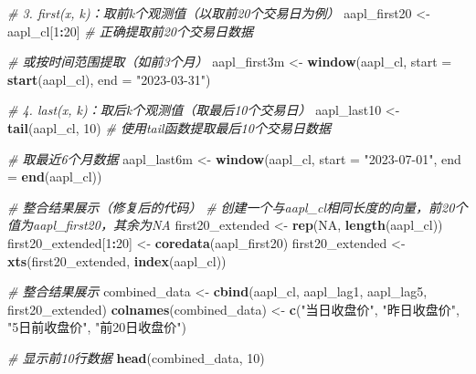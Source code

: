 \documentclass[]{ctexbook}
\newenvironment{Shaded}{\begin{snugshade}}{\end{snugshade}}
\newcommand{\AttributeTok}[1]{\textcolor[rgb]{0.13,0.29,0.53}{#1}}
\newcommand{\CommentTok}[1]{\textcolor[rgb]{0.56,0.35,0.01}{\textit{#1}}}
\newcommand{\ConstantTok}[1]{\textcolor[rgb]{0.56,0.35,0.01}{#1}}
\newcommand{\DecValTok}[1]{\textcolor[rgb]{0.00,0.00,0.81}{#1}}
\newcommand{\FunctionTok}[1]{\textcolor[rgb]{0.13,0.29,0.53}{\textbf{#1}}}
\newcommand{\NormalTok}[1]{#1}
\newcommand{\OtherTok}[1]{\textcolor[rgb]{0.56,0.35,0.01}{#1}}
\newcommand{\SpecialCharTok}[1]{\textcolor[rgb]{0.81,0.36,0.00}{\textbf{#1}}}
\newcommand{\StringTok}[1]{\textcolor[rgb]{0.31,0.60,0.02}{#1}}
\begin{document}
\begin{Shaded}
\begin{Highlighting}[]
\CommentTok{\# 3. first(x, k)：取前k个观测值（以取前20个交易日为例）}
\NormalTok{aapl\_first20 }\OtherTok{\textless{}{-}}\NormalTok{ aapl\_cl[}\DecValTok{1}\SpecialCharTok{:}\DecValTok{20}\NormalTok{]      }\CommentTok{\# 正确提取前20个交易日数据}

\CommentTok{\# 或按时间范围提取（如前3个月）}
\NormalTok{aapl\_first3m }\OtherTok{\textless{}{-}} \FunctionTok{window}\NormalTok{(aapl\_cl, }\AttributeTok{start =} \FunctionTok{start}\NormalTok{(aapl\_cl), }\AttributeTok{end =} \StringTok{"2023{-}03{-}31"}\NormalTok{)}

\CommentTok{\# 4. last(x, k)：取后k个观测值（取最后10个交易日）}
\NormalTok{aapl\_last10 }\OtherTok{\textless{}{-}} \FunctionTok{tail}\NormalTok{(aapl\_cl, }\DecValTok{10}\NormalTok{)   }\CommentTok{\# 使用tail函数提取最后10个交易日数据}

\CommentTok{\# 取最近6个月数据}
\NormalTok{aapl\_last6m }\OtherTok{\textless{}{-}} \FunctionTok{window}\NormalTok{(aapl\_cl, }\AttributeTok{start =} \StringTok{"2023{-}07{-}01"}\NormalTok{, }\AttributeTok{end =} \FunctionTok{end}\NormalTok{(aapl\_cl))}

\CommentTok{\# 整合结果展示（修复后的代码）}
\CommentTok{\# 创建一个与aapl\_cl相同长度的向量，前20个值为aapl\_first20，其余为NA}
\NormalTok{first20\_extended }\OtherTok{\textless{}{-}} \FunctionTok{rep}\NormalTok{(}\ConstantTok{NA}\NormalTok{, }\FunctionTok{length}\NormalTok{(aapl\_cl))}
\NormalTok{first20\_extended[}\DecValTok{1}\SpecialCharTok{:}\DecValTok{20}\NormalTok{] }\OtherTok{\textless{}{-}} \FunctionTok{coredata}\NormalTok{(aapl\_first20)}
\NormalTok{first20\_extended }\OtherTok{\textless{}{-}} \FunctionTok{xts}\NormalTok{(first20\_extended, }\FunctionTok{index}\NormalTok{(aapl\_cl))}

\CommentTok{\# 整合结果展示}
\NormalTok{combined\_data }\OtherTok{\textless{}{-}} \FunctionTok{cbind}\NormalTok{(aapl\_cl, aapl\_lag1, aapl\_lag5, first20\_extended)}
\FunctionTok{colnames}\NormalTok{(combined\_data) }\OtherTok{\textless{}{-}} \FunctionTok{c}\NormalTok{(}\StringTok{"当日收盘价"}\NormalTok{, }\StringTok{"昨日收盘价"}\NormalTok{, }\StringTok{"5日前收盘价"}\NormalTok{, }\StringTok{"前20日收盘价"}\NormalTok{)}

\CommentTok{\# 显示前10行数据}
\FunctionTok{head}\NormalTok{(combined\_data, }\DecValTok{10}\NormalTok{)}
\end{Highlighting}
\end{Shaded}
\end{document}
